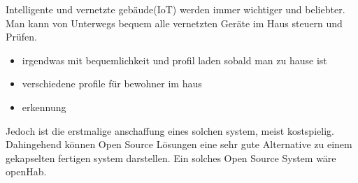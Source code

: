 Intelligente und vernetzte gebäude(IoT) werden immer wichtiger und beliebter.
Man kann von Unterwegs bequem alle vernetzten Geräte im Haus steuern und Prüfen.
\begin{itemize}
      \item irgendwas mit bequemlichkeit und profil laden sobald man zu hause ist
      \item verschiedene profile für bewohner im haus
			\item erkennung
\end{itemize}

Jedoch ist die erstmalige anschaffung eines solchen system, meist kostspielig.
Dahingehend können Open Source Lösungen eine sehr gute Alternative zu einem gekapselten fertigen system darstellen.
Ein solches Open Source System wäre openHab.